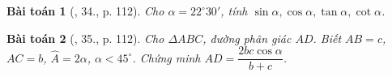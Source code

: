 \documentclass{article}
\newtheorem{baitoan}{Bài toán}
\begin{document}
\begin{baitoan}[\cite{Tuyen_Toan_9}, 34., p. 112]
	Cho $\alpha = 22^\circ30'$, tính $\sin\alpha,\cos\alpha,\tan\alpha,\cot\alpha$.
\end{baitoan}

\begin{baitoan}[\cite{Tuyen_Toan_9}, 35., p. 112]
	Cho $\Delta ABC$, đường phân giác $AD$. Biết $AB = c$, $AC = b$, $\widehat{A} = 2\alpha$, $\alpha < 45^\circ$. Chứng minh $AD = \dfrac{2bc\cos\alpha}{b + c}$.
\end{baitoan}


\printbibliography[heading=bibintoc]
	
\end{document}
